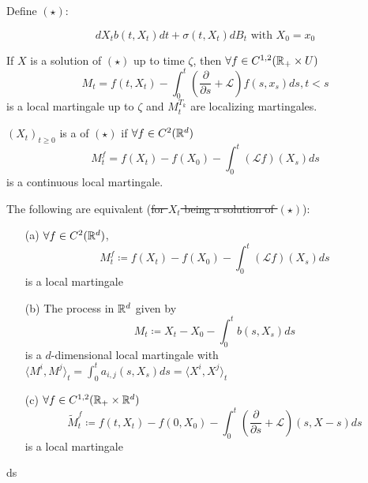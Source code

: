 Define $(\star)$:

\[dX_t b(t,X_t)dt+\sigma(t,X_t)dB_t\text{ with } X_0=x_0\]

\begin{theorem}\label{thm:1.17}
    If $X$ is a solution of $(\star)$ up to time $\zeta$, then $\forall f\in C^{1,2}(\mathbb{R}_+\times U)$
    \[M_t=f(t,X_t)-\int_0^t\left(\frac{\partial}{\partial s}+\mathcal{L}\right)f(s,x_s)ds, t<s\]
    is a local martingale up to $\zeta$ and $M_t^{T_k}$ are localizing martingales.
\end{theorem}

\begin{definition}\label{def:1.18}
    $(X_t)_{t\geq 0}$ is a  of $(\star)$
    if $\forall f\in C^2(\mathbb{R}^d)$
    \[M_t^f=f(X_t)-f(X_0)-\int_0^t(\mathcal{L}f)(X_s)ds\]
    is a continuous local martingale. 
\end{definition}

\begin{theorem}\label{thm:1.19}
    The following are equivalent (\st{for $X_t$ being a solution of $(\star)$}):
    \begin{enumerate}
        \item[(a)] $\forall f\in C^2(\mathbb{R}^d)$, \[M_t^f\coloneqq f(X_t)-f(X_0)-\int_0^t(\mathcal{L}f)(X_s)ds\] is a local martingale 
        \item[(b)] The process in $\mathbb{R}^d$ given by \[M_t\coloneqq X_t-X_0-\int_0^t b(s,X_s)ds\] is a $d$-dimensional local martingale with $\langle M^i,M^j\rangle_t=\int_0^t a_{i,j}(s,X_s)ds=\langle X^i,X^j\rangle_t$ 
        \item[(c)] $\forall f\in C^{1,2}(\mathbb{R}_+\times \mathbb{R}^d)$ \[\tilde{M}_t^f\coloneqq f(t,X_t)-f(0,X_0)-\int_0^t\left(\frac{\partial}{\partial s}+\mathcal{L}\right)(s,X-s)ds\] is a local martingale  
    \end{enumerate}ds
\end{theorem}

